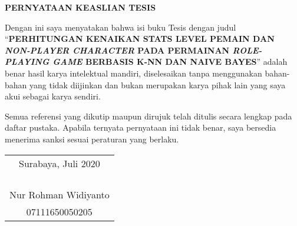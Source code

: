 \begin{center}
\large\textbf{PERNYATAAN KEASLIAN TESIS}
\end{center}
\vspace{1ex}
\begin{spacing}{1.5}

\setlength{\parindent}{0.9cm} Dengan ini saya menyatakan bahwa isi buku Tesis dengan judul ``\textbf{PERHITUNGAN KENAIKAN STATS LEVEL PEMAIN DAN \textit{NON-PLAYER CHARACTER} PADA PERMAINAN \textit{ROLE-PLAYING GAME} BERBASIS K-NN DAN NAIVE BAYES}'' adalah benar hasil karya intelektual mandiri, diselesaikan tanpa menggunakan bahan-bahan yang tidak diijinkan dan bukan merupakan karya pihak lain yang saya akui sebagai karya sendiri.
\vspace{1ex}

Semua referensi yang dikutip maupun dirujuk telah ditulis secara lengkap pada daftar pustaka. Apabila ternyata pernyataan ini tidak benar, saya bersedia menerima sanksi sesuai peraturan yang berlaku.
\vspace{1ex}
\end{spacing}
\begin{flushright}
\begin{tabular}[b]{c}
  Surabaya, Juli 2020\\
  \\
  \\
  \\
  \\
  Nur Rohman Widiyanto\\
  07111650050205
\end{tabular}
\end{flushright}